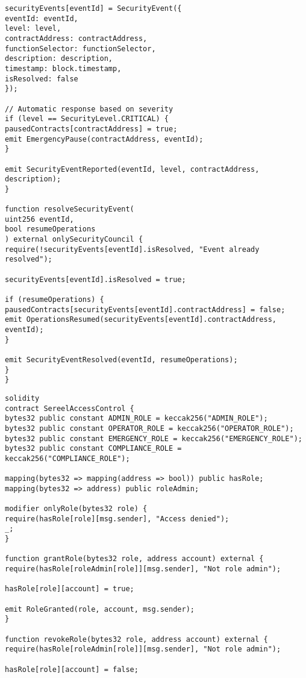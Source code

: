 \documentclass[12pt]{article}
\begin{document}
{{{\begin{lstlisting}
securityEvents[eventId] = SecurityEvent({
eventId: eventId,
level: level,
contractAddress: contractAddress,
functionSelector: functionSelector,
description: description,
timestamp: block.timestamp,
isResolved: false
});

// Automatic response based on severity
if (level == SecurityLevel.CRITICAL) {
pausedContracts[contractAddress] = true;
emit EmergencyPause(contractAddress, eventId);
}

emit SecurityEventReported(eventId, level, contractAddress, description);
}

function resolveSecurityEvent(
uint256 eventId,
bool resumeOperations
) external onlySecurityCouncil {
require(!securityEvents[eventId].isResolved, "Event already resolved");

securityEvents[eventId].isResolved = true;

if (resumeOperations) {
pausedContracts[securityEvents[eventId].contractAddress] = false;
emit OperationsResumed(securityEvents[eventId].contractAddress, eventId);
}

emit SecurityEventResolved(eventId, resumeOperations);
}
}
\end{lstlisting}



\begin{lstlisting}
solidity
contract SereelAccessControl {
bytes32 public constant ADMIN_ROLE = keccak256("ADMIN_ROLE");
bytes32 public constant OPERATOR_ROLE = keccak256("OPERATOR_ROLE");
bytes32 public constant EMERGENCY_ROLE = keccak256("EMERGENCY_ROLE");
bytes32 public constant COMPLIANCE_ROLE = keccak256("COMPLIANCE_ROLE");

mapping(bytes32 => mapping(address => bool)) public hasRole;
mapping(bytes32 => address) public roleAdmin;

modifier onlyRole(bytes32 role) {
require(hasRole[role][msg.sender], "Access denied");
_;
}

function grantRole(bytes32 role, address account) external {
require(hasRole[roleAdmin[role]][msg.sender], "Not role admin");

hasRole[role][account] = true;

emit RoleGranted(role, account, msg.sender);
}

function revokeRole(bytes32 role, address account) external {
require(hasRole[roleAdmin[role]][msg.sender], "Not role admin");

hasRole[role][account] = false;


\end{lstlisting}}}}
\end{document}
